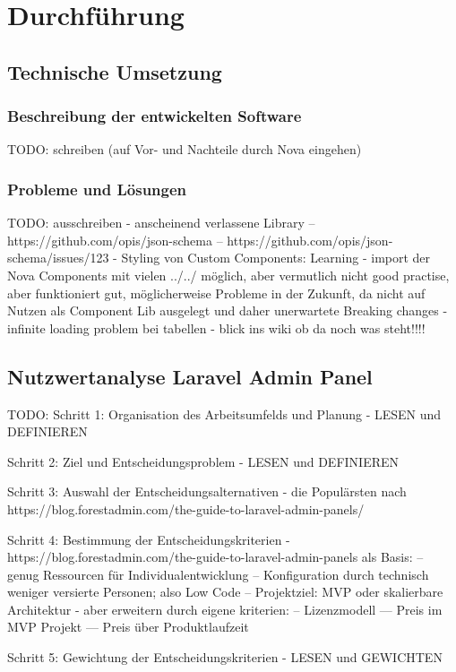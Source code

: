 \section{Durchführung}


\subsection{Technische Umsetzung}

\subsubsection{Beschreibung der entwickelten Software}
TODO: schreiben (auf Vor- und Nachteile durch Nova eingehen)

\subsubsection{Probleme und Lösungen}
TODO: ausschreiben
- anscheinend verlassene Library
-- https://github.com/opis/json-schema
-- https://github.com/opis/json-schema/issues/123
- Styling von Custom Components: Learning - import der Nova Components mit vielen ../../ möglich, aber vermutlich nicht good practise, aber funktioniert gut, möglicherweise Probleme in der Zukunft, da nicht auf Nutzen als Component Lib ausgelegt und daher unerwartete Breaking changes
- infinite loading problem bei tabellen
- blick ins wiki ob da noch was steht!!!!


\subsection{Nutzwertanalyse Laravel Admin Panel}
TODO:
Schritt 1: Organisation des Arbeitsumfelds und Planung
- LESEN und DEFINIEREN

Schritt 2: Ziel und Entscheidungsproblem
- LESEN und DEFINIEREN

Schritt 3: Auswahl der Entscheidungsalternativen
- die Populärsten nach https://blog.forestadmin.com/the-guide-to-laravel-admin-panels/

Schritt 4: Bestimmung der Entscheidungskriterien
- https://blog.forestadmin.com/the-guide-to-laravel-admin-panels als Basis:
-- genug Ressourcen für Individualentwicklung
-- Konfiguration durch technisch weniger versierte Personen; also Low Code
-- Projektziel: MVP oder skalierbare Architektur
- aber erweitern durch eigene kriterien:
-- Lizenzmodell
--- Preis im MVP Projekt
--- Preis über Produktlaufzeit

Schritt 5: Gewichtung der Entscheidungskriterien
- LESEN und GEWICHTEN

